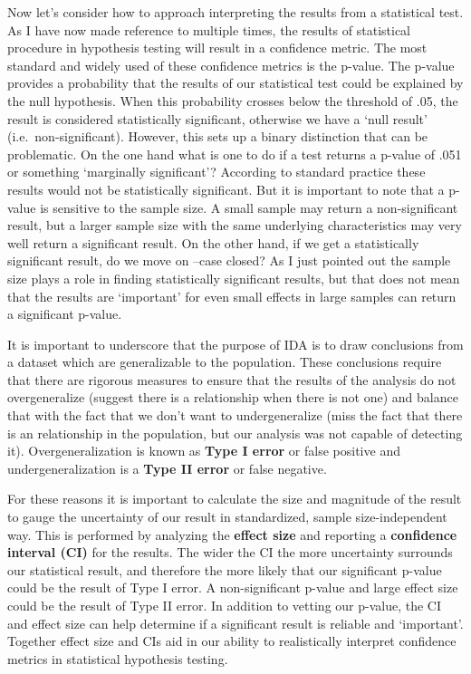 \documentclass[
  letterpaper,
]{scrbook}
\begin{document}
Now let's consider how to approach interpreting the results from a
statistical test. As I have now made reference to multiple times, the
results of statistical procedure in hypothesis testing will result in a
confidence metric. The most standard and widely used of these confidence
metrics is the p-value. The p-value provides a probability that the
results of our statistical test could be explained by the null
hypothesis. When this probability crosses below the threshold of .05,
the result is considered statistically significant, otherwise we have a
`null result' (i.e.~non-significant). However, this sets up a binary
distinction that can be problematic. On the one hand what is one to do
if a test returns a p-value of .051 or something `marginally
significant'? According to standard practice these results would not be
statistically significant. But it is important to note that a p-value is
sensitive to the sample size. A small sample may return a
non-significant result, but a larger sample size with the same
underlying characteristics may very well return a significant result. On
the other hand, if we get a statistically significant result, do we move
on --case closed? As I just pointed out the sample size plays a role in
finding statistically significant results, but that does not mean that
the results are `important' for even small effects in large samples can
return a significant p-value.

It is important to underscore that the purpose of IDA is to draw
conclusions from a dataset which are generalizable to the population.
These conclusions require that there are rigorous measures to ensure
that the results of the analysis do not overgeneralize (suggest there is
a relationship when there is not one) and balance that with the fact
that we don't want to undergeneralize (miss the fact that there is an
relationship in the population, but our analysis was not capable of
detecting it). Overgeneralization is known as \textbf{Type I error} or
false positive and undergeneralization is a \textbf{Type II error} or
false negative.

For these reasons it is important to calculate the size and magnitude of
the result to gauge the uncertainty of our result in standardized,
sample size-independent way. This is performed by analyzing the
\textbf{effect size} and reporting a \textbf{confidence interval (CI)}
for the results. The wider the CI the more uncertainty surrounds our
statistical result, and therefore the more likely that our significant
p-value could be the result of Type I error. A non-significant p-value
and large effect size could be the result of Type II error. In addition
to vetting our p-value, the CI and effect size can help determine if a
significant result is reliable and `important'. Together effect size and
CIs aid in our ability to realistically interpret confidence metrics in
statistical hypothesis testing.
\end{document}
